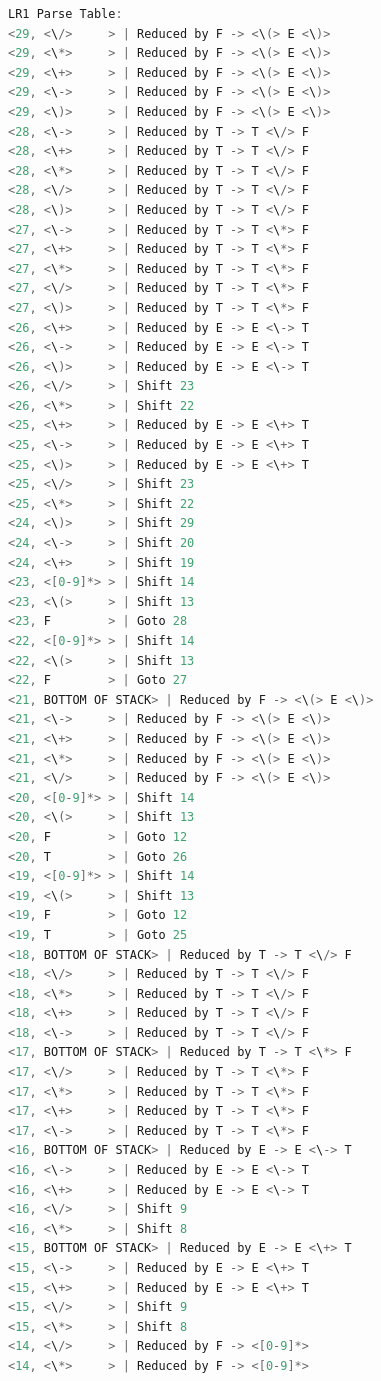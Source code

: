 \begin{lstlisting}[language=c++]
LR1 Parse Table:
<29, <\/>     > | Reduced by F -> <\(> E <\)>
<29, <\*>     > | Reduced by F -> <\(> E <\)>
<29, <\+>     > | Reduced by F -> <\(> E <\)>
<29, <\->     > | Reduced by F -> <\(> E <\)>
<29, <\)>     > | Reduced by F -> <\(> E <\)>
<28, <\->     > | Reduced by T -> T <\/> F
<28, <\+>     > | Reduced by T -> T <\/> F
<28, <\*>     > | Reduced by T -> T <\/> F
<28, <\/>     > | Reduced by T -> T <\/> F
<28, <\)>     > | Reduced by T -> T <\/> F
<27, <\->     > | Reduced by T -> T <\*> F
<27, <\+>     > | Reduced by T -> T <\*> F
<27, <\*>     > | Reduced by T -> T <\*> F
<27, <\/>     > | Reduced by T -> T <\*> F
<27, <\)>     > | Reduced by T -> T <\*> F
<26, <\+>     > | Reduced by E -> E <\-> T
<26, <\->     > | Reduced by E -> E <\-> T
<26, <\)>     > | Reduced by E -> E <\-> T
<26, <\/>     > | Shift 23
<26, <\*>     > | Shift 22
<25, <\+>     > | Reduced by E -> E <\+> T
<25, <\->     > | Reduced by E -> E <\+> T
<25, <\)>     > | Reduced by E -> E <\+> T
<25, <\/>     > | Shift 23
<25, <\*>     > | Shift 22
<24, <\)>     > | Shift 29
<24, <\->     > | Shift 20
<24, <\+>     > | Shift 19
<23, <[0-9]*> > | Shift 14
<23, <\(>     > | Shift 13
<23, F        > | Goto 28
<22, <[0-9]*> > | Shift 14
<22, <\(>     > | Shift 13
<22, F        > | Goto 27
<21, BOTTOM OF STACK> | Reduced by F -> <\(> E <\)>
<21, <\->     > | Reduced by F -> <\(> E <\)>
<21, <\+>     > | Reduced by F -> <\(> E <\)>
<21, <\*>     > | Reduced by F -> <\(> E <\)>
<21, <\/>     > | Reduced by F -> <\(> E <\)>
<20, <[0-9]*> > | Shift 14
<20, <\(>     > | Shift 13
<20, F        > | Goto 12
<20, T        > | Goto 26
<19, <[0-9]*> > | Shift 14
<19, <\(>     > | Shift 13
<19, F        > | Goto 12
<19, T        > | Goto 25
<18, BOTTOM OF STACK> | Reduced by T -> T <\/> F
<18, <\/>     > | Reduced by T -> T <\/> F
<18, <\*>     > | Reduced by T -> T <\/> F
<18, <\+>     > | Reduced by T -> T <\/> F
<18, <\->     > | Reduced by T -> T <\/> F
<17, BOTTOM OF STACK> | Reduced by T -> T <\*> F
<17, <\/>     > | Reduced by T -> T <\*> F
<17, <\*>     > | Reduced by T -> T <\*> F
<17, <\+>     > | Reduced by T -> T <\*> F
<17, <\->     > | Reduced by T -> T <\*> F
<16, BOTTOM OF STACK> | Reduced by E -> E <\-> T
<16, <\->     > | Reduced by E -> E <\-> T
<16, <\+>     > | Reduced by E -> E <\-> T
<16, <\/>     > | Shift 9
<16, <\*>     > | Shift 8
<15, BOTTOM OF STACK> | Reduced by E -> E <\+> T
<15, <\->     > | Reduced by E -> E <\+> T
<15, <\+>     > | Reduced by E -> E <\+> T
<15, <\/>     > | Shift 9
<15, <\*>     > | Shift 8
<14, <\/>     > | Reduced by F -> <[0-9]*>
<14, <\*>     > | Reduced by F -> <[0-9]*>

\end{lstlisting}

